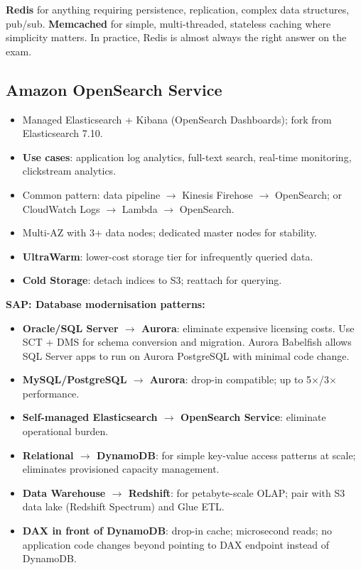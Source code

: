 \begin{examtip}
\textbf{Redis} for anything requiring persistence, replication, complex data structures, pub/sub.
\textbf{Memcached} for simple, multi-threaded, stateless caching where simplicity matters.
In practice, Redis is almost always the right answer on the exam.
\end{examtip}


\subsection{Amazon OpenSearch Service}

\begin{keyfacts}
\begin{itemize}
  \item Managed Elasticsearch + Kibana (OpenSearch Dashboards); fork from Elasticsearch 7.10.
  \item \textbf{Use cases}: application log analytics, full-text search, real-time monitoring,
        clickstream analytics.
  \item Common pattern: data pipeline $\rightarrow$ Kinesis Firehose $\rightarrow$ OpenSearch;
        or CloudWatch Logs $\rightarrow$ Lambda $\rightarrow$ OpenSearch.
  \item Multi-AZ with 3+ data nodes; dedicated master nodes for stability.
  \item \textbf{UltraWarm}: lower-cost storage tier for infrequently queried data.
  \item \textbf{Cold Storage}: detach indices to S3; reattach for querying.
\end{itemize}
\end{keyfacts}

\begin{sapdepth}
\textbf{SAP: Database modernisation patterns:}
\begin{itemize}
  \item \textbf{Oracle/SQL Server $\rightarrow$ Aurora}: eliminate expensive licensing costs.
        Use SCT + DMS for schema conversion and migration.
        Aurora Babelfish allows SQL Server apps to run on Aurora PostgreSQL with minimal code change.
  \item \textbf{MySQL/PostgreSQL $\rightarrow$ Aurora}: drop-in compatible; up to 5$\times$/3$\times$ performance.
  \item \textbf{Self-managed Elasticsearch $\rightarrow$ OpenSearch Service}: eliminate operational burden.
  \item \textbf{Relational $\rightarrow$ DynamoDB}: for simple key-value access patterns at scale;
        eliminates provisioned capacity management.
  \item \textbf{Data Warehouse $\rightarrow$ Redshift}: for petabyte-scale OLAP; pair with
        S3 data lake (Redshift Spectrum) and Glue ETL.
  \item \textbf{DAX in front of DynamoDB}: drop-in cache; microsecond reads;
        no application code changes beyond pointing to DAX endpoint instead of DynamoDB.
\end{itemize}
\end{sapdepth}
